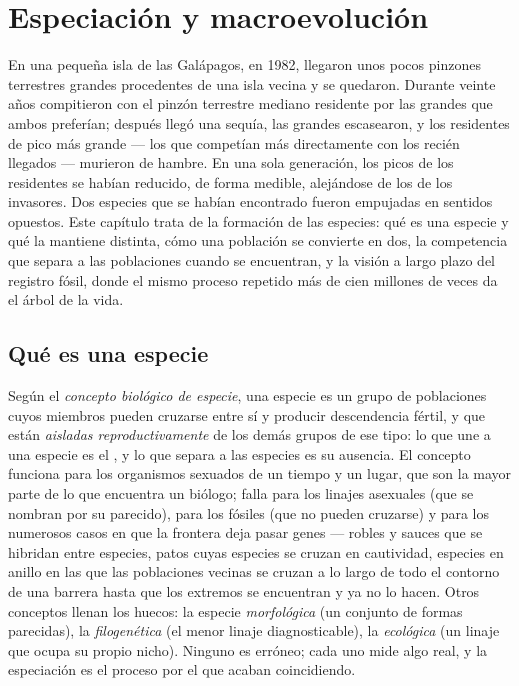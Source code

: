 \chapter{Especiación y macroevolución}\label{ch:b2:speciation}

En una pequeña isla de las Galápagos, en 1982, llegaron unos pocos
pinzones terrestres grandes procedentes de una isla vecina y se quedaron.
Durante veinte años compitieron con el pinzón terrestre mediano residente
por las  grandes que ambos preferían; después llegó una sequía,
las  grandes escasearon, y los residentes de pico más grande ---
los que competían más directamente con los recién llegados --- murieron de
hambre. En una sola generación, los picos de los residentes se habían
reducido, de forma medible, alejándose de los de los invasores. Dos
especies que se habían encontrado fueron empujadas en sentidos opuestos.
Este capítulo trata de la formación de las especies: qué es una especie y
qué la mantiene distinta, cómo una población se convierte en dos, la
competencia que separa a las poblaciones cuando se encuentran, y la visión
a largo plazo del registro fósil, donde el mismo proceso repetido más de
cien millones de veces da el árbol de la vida.

\section{Qué es una especie}

\begin{definition}[Especie]\label{def:b2:speciation:species}
Según el \emph{concepto biológico de especie}, una especie es un grupo de
poblaciones cuyos miembros pueden cruzarse entre sí y producir
descendencia fértil, y que están \emph{aisladas reproductivamente} de los
demás grupos de ese tipo: lo que une a una especie es el , y
lo que separa a las especies es su ausencia. El concepto funciona para los
organismos sexuados de un tiempo y un lugar, que son la mayor parte de lo
que encuentra un biólogo; falla para los linajes asexuales (que se
nombran por su parecido), para los fósiles (que no pueden cruzarse) y para
los numerosos casos en que la frontera deja pasar genes --- robles y
sauces que se hibridan entre especies, patos cuyas especies se cruzan en
cautividad, especies en anillo en las que las poblaciones vecinas se
cruzan a lo largo de todo el contorno de una barrera hasta que los
extremos se encuentran y ya no lo hacen. Otros conceptos llenan los
huecos: la especie \emph{morfológica} (un conjunto de formas parecidas),
la \emph{filogenética} (el menor linaje diagnosticable), la
\emph{ecológica} (un linaje que ocupa su propio nicho). Ninguno es
erróneo; cada uno mide algo real, y la especiación es el proceso por el
que acaban coincidiendo.
\end{definition}

